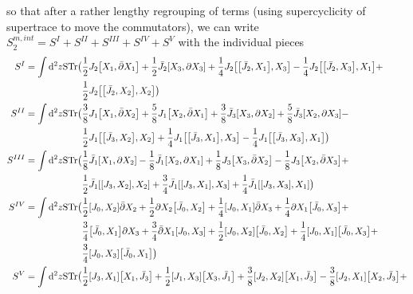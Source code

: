 \documentclass[12pt]{article}
\numberwithin{equation}{section}
\begin{document}
so that after a rather lengthy regrouping of terms (using supercyclicity of supertrace to move the commutators), we can write
$S_2^{m, int} = S^{I} + S^{II} + S^{III} + S^{IV} + S^V$ with the individual pieces
{\allowdisplaybreaks
\begin{align}
	S^{I} =  \int\dd^2z \text{STr}\big(&\frac{1}{2}J_2\comm{X_1}{\bar{\partial} X_1} + \frac{1}{2}\bar{J}_2\comm{X_3}{\partial X_3} + \frac{1}{4} J_2 \comm{\comm{\bar{J}_2}{X_1}}{X_3} - \frac{1}{4} J_2 \comm{\comm{\bar{J}_2}{X_3}}{X_1} + \nonumber \\
							 &\frac{1}{2} J_2 \comm{\comm{\bar{J}_2}{X_2}}{X_2}\big) \nonumber \\
	S^{II} = \int\dd^2z \text{STr}\big(& \frac{3}{8} J_1\comm{X_1}{\bar{\partial} X_2} + \frac{5}{8} J_1 \comm{X_2}{\bar{\partial}X_1} + \frac{3}{8} \bar{J}_3 \comm{X_3}{\partial X_2} + \frac{5}{8} \bar{J}_3 \comm{X_2}{\partial X_3} - \nonumber \\
							  & \frac{1}{2} J_1 \comm{\comm{\bar{J}_3}{X_2}}{X_2} + \frac{1}{4} J_1 \comm{\comm{\bar{J}_3}{X_1}}{X_3} - \frac{1}{4} J_1 \comm{\comm{\bar{J}_3}{X_3}}{X_1}\big) \nonumber \\
		S^{III} =  \int\dd^2z \text{STr}\big(&\frac{1}{8} \bar{J}_1\comm{X_1}{\partial X_2} - \frac{1}{8} \bar{J}_1 \comm{X_2}{\partial X_1} + \frac{1}{8} J_3 \comm{X_3}{\bar{\partial} X_2} - \frac{1}{8} J_3 \comm{X_2}{\bar{\partial} X_3} + \nonumber \\
								   & \frac{1}{2} \bar{J}_1 \comm{\comm{J_3}{X_2}}{X_2} + \frac{3}{4} \bar{J}_1 \comm{\comm{J_3}{X_1}}{X_3} + \frac{1}{4} \bar{J}_1 \comm{\comm{J_3}{X_3}}{X_1}\big) \nonumber \\
			S^{IV} =  \int\dd^2z \text{STr}\big(& \frac{1}{2} \comm{J_0}{X_2} \bar{\partial} X_2 + \frac{1}{2} \partial X_2 \comm{\bar{J}_0}{X_2} + \frac{1}{4} \comm{J_0}{X_1} \bar{\partial} X_3 + \frac{1}{4} \partial X_1 \comm{\bar{J}_0}{X_3} + \nonumber \\
							    & \frac{3}{4} \comm{\bar{J}_0}{X_1} \partial X_3 + \frac{3}{4} \bar{\partial} X_1 \comm{J_0}{X_3} + \frac{1}{2} \comm{J_0}{X_2} \comm{\bar{J}_0}{X_2} + \frac{1}{4} \comm{J_0}{X_1}\comm{\bar{J}_0}{X_3} + \nonumber \\
							    & \frac{3}{4} \comm{J_0}{X_3} \comm{\bar{J}_0}{X_1}\big) \nonumber \\
			S^{V} =  \int\dd^2z \text{STr}\big(&\frac{1}{2}\comm{J_3}{X_1}\comm{X_1}{\bar{J}_3} + \frac{1}{2}\comm{J_1}{X_3}\comm{X_3}{\bar{J}_1} + \frac{3}{8} \comm{J_2}{X_2}\comm{X_1}{\bar{J}_3} - \frac{3}{8}\comm{J_2}{X_1} \comm{X_2}{\bar{J}_3} + \nonumber \\

\end{align}}
\end{document}
